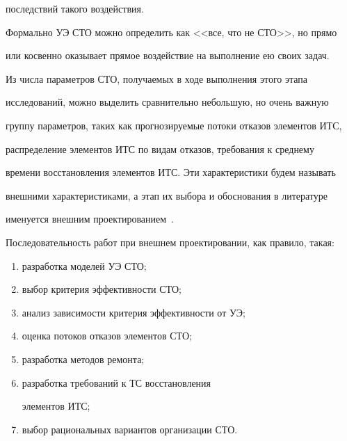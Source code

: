 последствий такого воздействия. 


  


  Формально УЭ СТО можно определить как <<все, что не СТО>>, но прямо 


или косвенно оказывает прямое воздействие на выполнение ею своих задач.


  


  Из числа параметров СТО, получаемых в ходе выполнения этого этапа 


исследований, можно выделить сравнительно небольшую, но очень важную 


группу параметров, таких как прогнозируемые потоки отказов элементов ИТС, 


распределение элементов ИТС по видам отказов, требования к среднему 


времени восстановления элементов ИТС. Эти характеристики будем называть 


внешними характеристиками, а этап их выбора и обоснования в литературе 


именуется внешним проектированием~\cite{12-gr}.


  


  Последовательность работ при внешнем проектировании, как правило, такая: 


  \begin{enumerate}[(1)]


  \item разработка моделей УЭ СТО;\\[-9pt]


  \item выбор критерия эффективности СТО;\\[-9pt]


  \item анализ зависимости критерия эффективности от УЭ;\\[-9pt]


  \item оценка потоков отказов элементов СТО;\\[-9pt]


  \item разработка методов ремонта;\\[-9pt]


  \item разработка требований к ТС восстановления 


элементов ИТС;\\[-9pt]


  \item выбор рациональных вариантов организации СТО.


  \end{enumerate}


